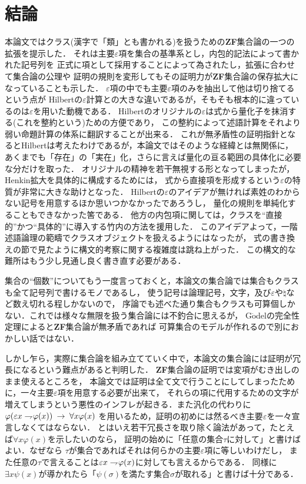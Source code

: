 \chapter{結論}
	本論文ではクラス(漢字で「類」とも書かれる)を扱うための{\bf ZF}集合論の一つの拡張を提示した．
	それは主要$\varepsilon$項を集合の基準系とし，内包的記法によって書かれた記号列を
	正式に項として採用することによって為されたし，拡張に合わせて集合論の公理や
	証明の規則を変形してもその証明力が{\bf ZF}集合論の保存拡大になっていることも示した．
	$\varepsilon$項の中でも主要$\varepsilon$項のみを抽出して他は切り捨てるという点が
	Hilbertの$\varepsilon$計算との大きな違いであるが，そもそも根本的に違っているのは$\varepsilon$を用いた動機である．
	Hilbertのオリジナルの$\varepsilon$は式から量化子を抹消する(これを整約という)ための方便であり，
	この整約によって述語計算をそれより弱い命題計算の体系に翻訳することが出来る．
	これが無矛盾性の証明指針となるとHilbertは考えたわけであるが，本論文ではそのような経緯とは無関係に，
	あくまでも「存在」の「実在」化，さらに言えば量化の亘る範囲の具体化に必要な分だけを取った．
	オリジナルの精神を若干無視する形となってしまったが，Henkin拡大を具体的に構成するためには，
	式から直接項を形成するという$\varepsilon$の特質が非常に大きな助けとなった．
	Hilbertの$\varepsilon$のアイデアが無ければ素姓のわからない記号を用意するほか思いつかなかったであろうし，
	量化の規則を単純化することもできなかった筈である．
	他方の内包項に関しては，クラスを``直接的''かつ``具体的''に導入する竹内\cite{TakeuchiSet}の方法を援用した．
	このアイデアよって，一階述語論理の範疇でクラスオブジェクトを扱えるようにはなったが，
	式の書き換えの節で見たように構文的考察に関する複雑度は跳ね上がった．
	この構文的な難所はもう少し見通し良く書き直す必要がある．
	
	集合の``個数''についてもう一度言っておくと，本論文の集合論では集合もクラスも全て記号列で書けるモノであるし，
	使う記号は論理記号，文字，及び$\varepsilon$や$\natural$など数え切れる程しかないので，
	序論でも述べた通り集合もクラスも可算個しかない．これでは様々な無限を扱う集合論には不釣合に思えるが，
	G$\ddot{\mbox{o}}$delの完全性定理によると{\bf ZF}集合論が無矛盾であれば
	可算集合のモデルが作れるので別におかしい話ではない．
	
	しかし乍ら，実際に集合論を組み立てていく中で，本論文の集合論には証明が冗長になるという難点があると判明した．
	{\bf ZF}集合論の証明では変項がむき出しのまま使えるところを，
	本論文では証明は全て文で行うことにしてしまったために，一々主要$\varepsilon$項を用意する必要が出来て，
	それらの項に代用するための文字が増えてしまうという悪性のインフレが起きる．また汎化の代わりに
	$\varphi(\varepsilon x \rightharpoondown\hspace{-0.25em} \varphi(x)) \hspace{0.25em}\rightarrow\hspace{0.25em} \forall x \varphi(x)$
	を用いるため，証明の初めには然るべき主要$\varepsilon$を一々宣言しなくてはならない．
	とはいえ若干冗長さを取り除く論法があって，たとえば$\forall x \varphi(x)$を示したいのなら，
	証明の始めに「任意の集合$\tau$に対して」と書けばよい．なぜなら
	$\tau$が集合であればそれは何らかの主要$\varepsilon$項に等しいわけだし，
	また任意の$\tau$で言えることは$\varepsilon x \rightharpoondown\hspace{-0.25em} \varphi(x)$に対しても言えるからである．
	同様に$\exists x \psi(x)$が導かれたら「$\psi(\sigma)$を満たす集合$\sigma$が取れる」と書けば十分である．
	
